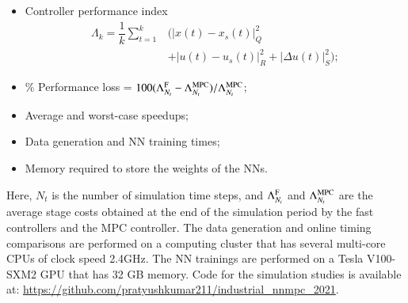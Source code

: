 \documentclass[preprint,5p, twocolumn, authoryear]{elsarticle}
\newcommand{\norm}[1]{\left| #1 \right|}
\begin{document}
\begin{itemize}
    \item Controller performance index
    \begin{align*}
    \Lambda_k = \dfrac{1}{k}\sum_{t=1}^{k} & \big(\norm{x(t) - x_{s} (t)}^2_{Q} \\
        & + \norm{u(t) - u_{s} (t)}^2_{R} + \norm{\Delta u(t)}^2_{S}\big);
    \end{align*}
    \item \% Performance loss = $100(\Lambda^{\textnormal{F}}_{N_{t}} -
    \Lambda^{\textnormal{MPC}}_{N_{t}})/\Lambda^{\textnormal{MPC}}_{N_{t}}$;
    \item Average and worst-case speedups;
    \item Data generation and NN training times;
    \item Memory required to store the weights of the NNs.
\end{itemize}
Here, $N_t$ is the number of simulation time steps, and
$\Lambda^{\textnormal{F}}_{N_{t}}$ and $\Lambda^{\textnormal{MPC}}_{N_{t}}$ are
the average stage costs obtained at the end of the simulation period by the fast
controllers and the MPC controller. The data generation and online timing
comparisons are performed on a computing cluster that has several multi-core
CPUs of clock speed 2.4GHz. The NN trainings are performed on a Tesla V100-SXM2
GPU that has 32 GB memory. Code for the simulation studies is available at:
\url{https://github.com/pratyushkumar211/industrial_nnmpc_2021}.
\end{document}
